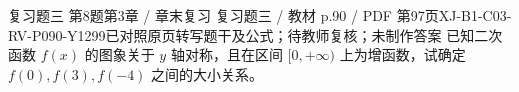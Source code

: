 \par\noindent\begin{minipage}{\linewidth}
\begin{bankitem}{复习题三 第8题}{第3章 / 章末复习 复习题三 / 教材 p.90 / PDF 第97页}{XJ-B1-C03-RV-P090-Y1299}{已对照原页转写题干及公式；待教师复核；未制作答案}
已知二次函数 $f(x)$ 的图象关于 $y$ 轴对称，且在区间 $[0,+\infty)$ 上为增函数，试确定 $f(0),f(3),f(-4)$ 之间的大小关系。
\end{bankitem}
\end{minipage}\par\medskip
